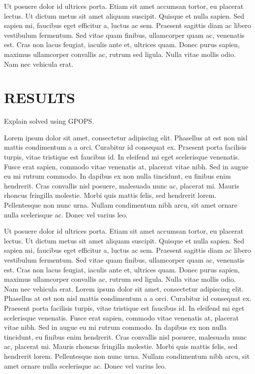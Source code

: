 \documentclass[letterpaper, 10 pt, conference]{ieeeconf}  %
\begin{document}
 Ut posuere dolor id ultrices porta. Etiam sit amet accumsan tortor, eu placerat lectus. Ut dictum metus sit amet aliquam suscipit. Quisque et nulla sapien. Sed sapien mi, faucibus eget efficitur a, luctus ac sem. Praesent sagittis diam ac libero vestibulum fermentum. Sed vitae quam finibus, ullamcorper quam ac, venenatis est. Cras non lacus feugiat, iaculis ante et, ultrices quam. Donec purus sapien, maximus ullamcorper convallis ac, rutrum sed ligula. Nulla vitae mollis odio. Nam nec vehicula erat. 

\section{RESULTS}\label{s:exp}

Explain solved using GPOPS.

 Lorem ipsum dolor sit amet, consectetur adipiscing elit. Phasellus at est non nisl mattis condimentum a a orci. Curabitur id consequat ex. Praesent porta facilisis turpis, vitae tristique est faucibus id. In eleifend mi eget scelerisque venenatis. Fusce erat sapien, commodo vitae venenatis at, placerat vitae nibh. Sed in augue eu mi rutrum commodo. In dapibus ex non nulla tincidunt, eu finibus enim hendrerit. Cras convallis nisl posuere, malesuada nunc ac, placerat mi. Mauris rhoncus fringilla molestie. Morbi quis mattis felis, sed hendrerit lorem. Pellentesque non nunc urna. Nullam condimentum nibh arcu, sit amet ornare nulla scelerisque ac. Donec vel varius leo.
 
 Ut posuere dolor id ultrices porta. Etiam sit amet accumsan tortor, eu placerat lectus. Ut dictum metus sit amet aliquam suscipit. Quisque et nulla sapien. Sed sapien mi, faucibus eget efficitur a, luctus ac sem. Praesent sagittis diam ac libero vestibulum fermentum. Sed vitae quam finibus, ullamcorper quam ac, venenatis est. Cras non lacus feugiat, iaculis ante et, ultrices quam. Donec purus sapien, maximus ullamcorper convallis ac, rutrum sed ligula. Nulla vitae mollis odio. Nam nec vehicula erat.
  Lorem ipsum dolor sit amet, consectetur adipiscing elit. Phasellus at est non nisl mattis condimentum a a orci. Curabitur id consequat ex. Praesent porta facilisis turpis, vitae tristique est faucibus id. In eleifend mi eget scelerisque venenatis. Fusce erat sapien, commodo vitae venenatis at, placerat vitae nibh. Sed in augue eu mi rutrum commodo. In dapibus ex non nulla tincidunt, eu finibus enim hendrerit. Cras convallis nisl posuere, malesuada nunc ac, placerat mi. Mauris rhoncus fringilla molestie. Morbi quis mattis felis, sed hendrerit lorem. Pellentesque non nunc urna. Nullam condimentum nibh arcu, sit amet ornare nulla scelerisque ac. Donec vel varius leo.
  
\end{document}
